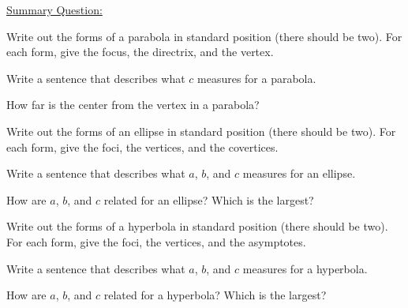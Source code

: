 \bq \label{q32} \underline{Summary Question:}

\be
\item Write out the forms of a parabola in standard position (there should be two). For each form, give the focus, the directrix, and the vertex.
\item Write a sentence that describes what $c$ measures for a parabola.
\item How far is the center from the vertex in a parabola?
\item Write out the forms of an ellipse in standard position (there should be two). For each form, give the foci, the vertices, and the covertices.
\item Write a sentence that describes what $a$, $b$, and $c$ measures for an ellipse.
\item How are $a$, $b$, and $c$ related for an ellipse? Which is the largest?
\item Write out the forms of a hyperbola in standard position (there should be two). For each form, give the foci, the vertices, and the asymptotes.
\item Write a sentence that describes what $a$, $b$, and $c$ measures for a hyperbola.
\item How are $a$, $b$, and $c$ related for a hyperbola? Which is the largest?
\ee \eq

